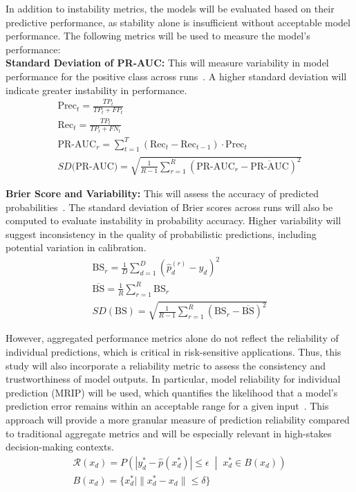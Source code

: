 \documentclass[12pt]{article}
\begin{document}
In addition to instability metrics, the models will be evaluated based on their predictive performance, as stability alone is insufficient without acceptable model performance. The following metrics will be used to measure the model's performance: \\
\textbf{Standard Deviation of PR-AUC:} This will measure variability in model performance for the positive class across runs~\cite{lopez2022instability}. A higher standard deviation will indicate greater instability in performance.
\begin{align}
  \text{Prec}_t=\frac{TP_t}{TP_t+FP_t} \\
  \text{Rec}_t=\frac{TP_t}{TP_t+FN_t} \\
  \text{PR-AUC}_r=\sum_{t=1}^{T}(\text{Rec}_t-\text{Rec}_{t-1})\cdot\text{Prec}_t \\
  SD\text{(PR-AUC)}=\sqrt{\frac{1}{R-1}\sum_{r=1}^{R}(\text{PR-AUC}_r-\overline{\text{PR-AUC}})^2}
\end{align}

\textbf{Brier Score and Variability:} This will assess the accuracy of predicted probabilities~\cite{rufibach2010use}. The standard deviation of Brier scores across runs will also be computed to evaluate instability in probability accuracy. Higher variability will suggest inconsistency in the quality of probabilistic predictions, including potential variation in calibration.
\begin{align}
  \text{BS}_r = \frac{1}{D} \sum_{d=1}^{D} \left( \hat{p}_d^{(r)} - y_d \right)^2 \\
  \overline{\text{BS}}=\frac{1}{R}\sum_{r=1}^{R}\text{BS}_r \\
  SD(\text{BS}) = \sqrt{ \frac{1}{R - 1} \sum_{r=1}^{R} \left( \text{BS}_r - \overline{\text{BS}} \right)^2 }
\end{align}

However, aggregated performance metrics alone do not reflect the reliability of individual predictions, which is critical in risk-sensitive applications. Thus, this study will also incorporate a reliability metric to assess the consistency and trustworthiness of model outputs. In particular, model reliability for individual prediction (MRIP) will be used, which quantifies the likelihood that a model's prediction error remains within an acceptable range for a given input~\cite{zhang2024reliability}. This approach will provide a more granular measure of prediction reliability compared to traditional aggregate metrics and will be especially relevant in high-stakes decision-making contexts.
\begin{align}
  \mathcal{R}(x_d) =
  P\left(
  \left| y_d^* - \hat{p}(x_d^*) \right| \le \epsilon
  \;\middle|\;
  x_d^* \in B(x_d)
  \right) \\
  B(x_d) = \{ x_d^* \mid \| x_d^* - x_d \| \le \delta \}
\end{align}
\end{document}

